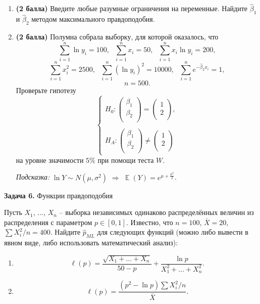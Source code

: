 \documentclass[10pt, a4paper]{extarticle}
\DeclareMathOperator{\E}{\mathbb{E}}
\begin{document}
	\begin{enumerate}
		\item \textbf{(2 балла)} Введите любые разумные ограничения на переменные. Найдите $\hat{\beta}_1$ и $\hat{\beta}_2$ методом максимального правдоподобия.
		\item  \textbf{(2 балла)} Полумна собрала выборку, для которой оказалось, что 
		\[
		\sum_{i=1}^n \ln y_i = 100, \text{ } \sum_{i = 1}^n x_i = 50,\text{ } \sum_{i = 1}^n x_i\ln y_i = 200,
		\]
		\[
		\sum_{i = 1}^n x^2_i = 2500, \text{ } \sum_{i = 1}^n (\ln y_i)^2 = 10000, \text{ } \sum_{i=1}^ne^{-\hat{\beta}_2x_i} = 1,
		\]
		\[
		n = 500.
		\]
		Проверьте гипотезу
		\[
		\begin{cases}
		H_0: \begin{pmatrix}
			\beta_1 \\
			\beta_2 \\
		\end{pmatrix} = 
		\begin{pmatrix}
			1 \\
			2 \\
		\end{pmatrix}, \\\\
		 H_A: \begin{pmatrix}
			\beta_1 \\
			\beta_2 \\
		\end{pmatrix} \ne
		\begin{pmatrix}
			1 \\
			2 \\
		\end{pmatrix}
		\end{cases}
		\]
		на уровне значимости $5\%$ при помощи теста $W$.
		
		\textit{Подсказка:} $\ln Y \sim N(\mu, \sigma^2)$ $\Rightarrow$ $\E(Y) = e^{\mu + \frac{\sigma^2}{2}}$.
	\end{enumerate}

	{\Large \textbf{Задача 6.} Функции правдоподобия}
	
	Пусть $X_1$, $\ldots$, $X_n$ – выборка независимых одинаково распределённых величин из распределения с параметром $p \in [0, 1]$. 
	Известно, что $n = 100$, $\bar{X} = 20$, $\sum{X_i^2}/n = 400$. Найдите $\hat{p}_{ML}$ для следующих функций (можно либо вывести в явном виде, либо использовать математический анализ):
	\begin{enumerate}
		\item 
		\[
		\ell(p) = \dfrac{\sqrt{X_1 + \ldots + X_n}}{50 - p} + \dfrac{\ln p}{X_1^2 + \ldots + X_n^2}.
		\]
		\item \[
		\ell(p) = \dfrac{(p^2 - \ln p)\sum{X_i^2}/n}{\bar{X}}.
		\]
	\end{enumerate}
\end{document}

